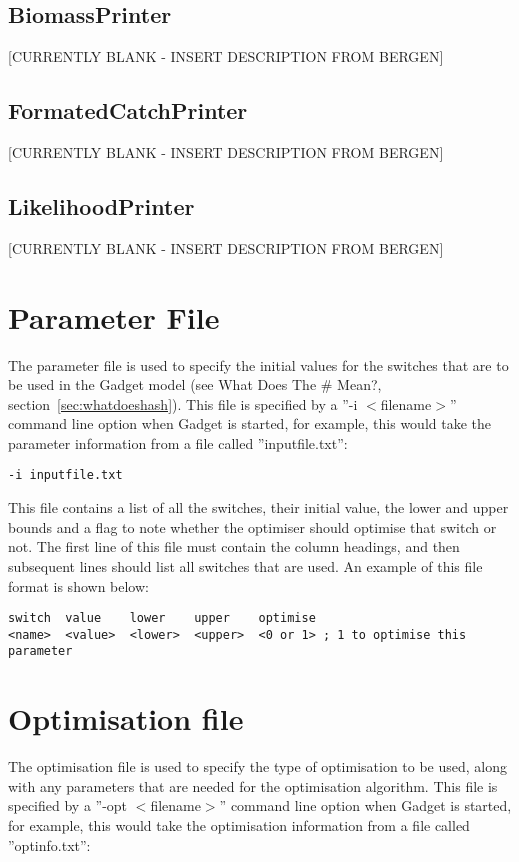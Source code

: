 \documentclass [a4paper, 10pt]{book}
\begin{document}
\section{BiomassPrinter}\label{sec:biomassprinter}
[CURRENTLY BLANK - INSERT DESCRIPTION FROM BERGEN]

\section{FormatedCatchPrinter}\label{sec:formatedcatchprinter}
[CURRENTLY BLANK - INSERT DESCRIPTION FROM BERGEN]

\section{LikelihoodPrinter}\label{sec:likelihoodprinter}
[CURRENTLY BLANK - INSERT DESCRIPTION FROM BERGEN]

\chapter{Parameter File}\label{chap:param}
The parameter file is used to specify the initial values for the switches that are to be used in the Gadget model (see What Does The \# Mean?, section~\ref{sec:whatdoeshash}).  This file is specified by a ''-i $<$filename$>$'' command line option when Gadget is started, for example, this would take the parameter information from a file called ''inputfile.txt'':

\begin{verbatim}
-i inputfile.txt
\end{verbatim}

This file contains a list of all the switches, their initial value, the lower and upper bounds and a flag to note whether the optimiser should optimise that switch or not.  The first line of this file must contain the column headings, and then subsequent lines should list all switches that are used.  An example of this file format is shown below:

\begin{verbatim}
switch  value    lower    upper    optimise
<name>  <value>  <lower>  <upper>  <0 or 1> ; 1 to optimise this parameter
\end{verbatim}

\chapter{Optimisation file}\label{chap:optim}
The optimisation file is used to specify the type of optimisation to be used, along with any parameters that are needed for the optimisation algorithm.  This file is specified by a ''-opt $<$filename$>$'' command line option when Gadget is started, for example, this would take the optimisation information from a file called ''optinfo.txt'':
\end{document}
